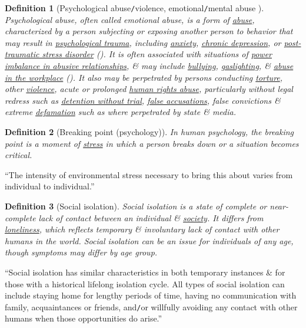 \documentclass[12pt]{article}
\newtheorem{definition}{Definition}[section]
\begin{document}
\begin{definition}[Psychological abuse{\tt/}violence, emotional{\tt/}mental abuse ]
	\emph{Psychological abuse}, often called \emph{emotional abuse}, is a form of \href{https://en.wikipedia.org/wiki/Abuse}{abuse}, characterized by a person subjecting or exposing another person to behavior that may result in \href{https://en.wikipedia.org/wiki/Psychological_trauma}{psychological trauma}, including \href{https://en.wikipedia.org/wiki/Anxiety_disorder}{anxiety}, \href{https://en.wikipedia.org/wiki/Chronic_depression}{chronic depression}, or \href{https://en.wikipedia.org/wiki/Post-traumatic_stress_disorder}{post-traumatic stress disorder} (\cite{Dutton1994,Dutton_Goodman_Bennett2000,Thompson_Kaplan1996}). It is often associated with situations of \href{https://en.wikipedia.org/wiki/Abusive_power_and_control}{power imbalance in abusive relationships}, \& may include \href{https://en.wikipedia.org/wiki/Bullying}{bullying}, \href{https://en.wikipedia.org/wiki/Gaslighting}{gaslighting}, \& \href{https://en.wikipedia.org/wiki/Workplace_bullying}{abuse in the workplace} (\cite{Dutton_Goodman_Bennett2000,Thompson_Kaplan1996}). It also may be perpetrated by persons conducting \href{https://en.wikipedia.org/wiki/Torture}{torture}, other \href{https://en.wikipedia.org/wiki/Violence}{violence}, acute or prolonged \href{https://en.wikipedia.org/wiki/Human_rights_abuse}{human rights abuse}, particularly without legal redress such as \href{https://en.wikipedia.org/wiki/Detention_without_trial}{detention without trial}, \href{https://en.wikipedia.org/wiki/False_accusation}{false accusations}, false convictions \& extreme \href{https://en.wikipedia.org/wiki/Defamation}{defamation} such as where perpetrated by state \& media. 
\end{definition}

\begin{definition}[Breaking point (psychology)]
	In human psychology, the \emph{breaking point} is a moment of \href{https://en.wikipedia.org/wiki/Stress_(medicine)}{stress} in which a person breaks down or a situation becomes critical.
\end{definition}
``The intensity of environmental stress necessary to bring this about varies from individual to individual.''

\begin{definition}[Social isolation]
	\emph{Social isolation} is a state of complete or near-complete lack of contact between an individual \& \href{https://en.wikipedia.org/wiki/Society}{society}. It differs from \href{https://en.wikipedia.org/wiki/Loneliness}{loneliness}, which reflects temporary \& involuntary lack of contact with other humans in the world. Social isolation can be an issue for individuals of any age, though symptoms may differ by age group.
\end{definition}
``Social isolation has similar characteristics in both temporary instances \& for those with a historical lifelong isolation cycle. All types of social isolation can include staying home for lengthy periods of time, having no communication with family, acquaintances or friends, and{\tt/}or willfully avoiding any contact with other humans when those opportunities do arise.''
\end{document}
